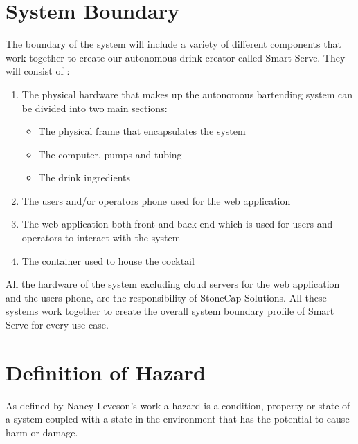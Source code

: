\documentclass{article}
\begin{document}
\section{System Boundary}
    The boundary of the system will include a variety of different components that work together to create our autonomous drink creator called Smart Serve. They will consist of :
    \begin{enumerate}
    \item The physical hardware that makes up the autonomous bartending system can be divided into two main sections:
        \begin {itemize}
        \item The physical frame that encapsulates the system 
        \item The computer, pumps and tubing 
        \item The drink ingredients 
        \end{itemize}
    \item The users and/or operators phone used for the web application 
    \item The web application both front and back end which is used for users and operators to interact with the system
    \item The container used to house the cocktail 
    \end{enumerate}
    All the hardware of the system excluding cloud servers for the web application and the users phone, are the responsibility of StoneCap Solutions. All these systems work together to create the overall system boundary profile of Smart Serve for every use case. 

\section{Definition of Hazard}
As defined by Nancy Leveson's work a hazard is a condition, property or state of a system coupled with a state in the environment that has the potential to cause harm or damage. %
    
\end{document}
